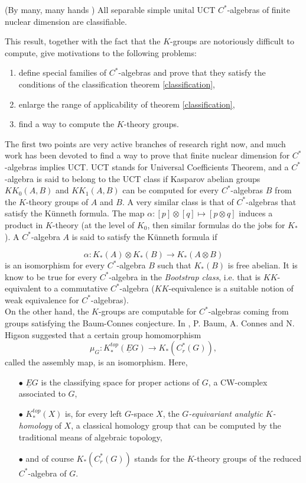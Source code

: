 \begin{theorem}\label{classification}(By many, many hands \cite{}) All separable simple unital UCT $C^*$-algebras of finite nuclear dimension are classifiable.
\end{theorem}

This result, together with the fact that the $K$-groups are notoriously difficult to compute, give motivations to the following problems:
\begin{enumerate}
\item define special families of $C^*$-algebras and prove that they satisfy the conditions of the classification theorem \ref{classification},
\item enlarge the range of applicability of theorem \ref{classification},
\item find a way to compute the $K$-theory groups.
\end{enumerate}    

The first two points are very active branches of research right now, and much work has been devoted to find a way to prove that finite nuclear dimension for $C^*$-algebras implies UCT. UCT stands for Universal Coefficients Theorem, and a $C^*$-algebra is said to belong to the UCT class if Kasparov abelian groups $KK_0(A,B)$ and $KK_1(A,B)$ can be computed for every $C^*$-algebras $B$ from the $K$-theory groups of $A$ and $B$. A very similar class is that of $C^*$-algebras that satisfy the K\"unneth formula. The map $\alpha: [p]\otimes [q] \mapsto [p\otimes q]$ induces a product in $K$-theory (at the level of $K_0$, then similar formulas do the jobs for $K_*$). A $C^*$-algebra $A$ is said to satisfy the K\"unneth formula if 

\[\alpha: K_*(A) \otimes K_*(B)\rightarrow K_*(A\otimes B)\]
 is an isomorphism for every $C^*$-algebra $B$ such that $K_*(B)$ is free abelian. It is know to be true for every $C^*$-algebra in the \textit{Bootstrap class}, i.e. that is $KK$-equivalent to a commutative $C^*$-algebra ($KK$-equivalence is a suitable notion of weak equivalence for $C^*$-algebras).\\

On the other hand, the $K$-groups are computable for $C^*$-algebras coming from groups satisfying the Baum-Connes conjecture. In \cite{BCH84}, P. Baum, A. Connes and N. Higson suggested that a certain group homomorphism
\[\mu_G : K_*^{top}(\underline E G) \rightarrow K_*(C_r^*(G)), \]
called the assembly map, is an isomorphism. Here, 
\begin{itemize}
\item[$\bullet$] $\underline E G$ is the classifying space for proper actions of $G$, a CW-complex associated to $G$,
\item[$\bullet$] $K_*^{top}(X)$ is, for every left $G$-space $X$, the \textit{$G$-equivariant analytic $K$-homology} of $X$, a classical homology group that can be computed by the traditional means of algebraic topology,
\item[$\bullet$] and of course $K_*(C_r^*(G))$ stands for the $K$-theory groups of the reduced $C^*$-algebra of $G$. 
\end{itemize}

